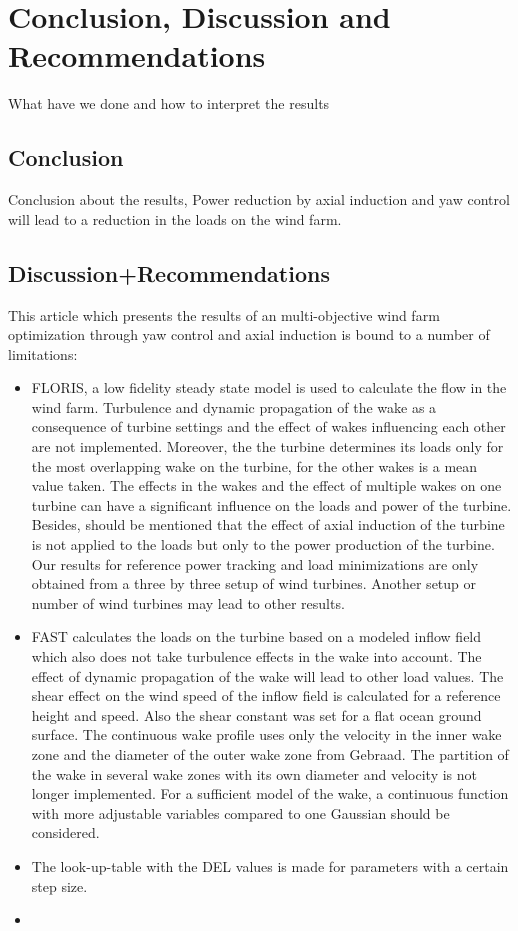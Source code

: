 \section{Conclusion, Discussion and Recommendations}
What have we done and how to interpret the results
\subsection{Conclusion}
Conclusion about the results, Power reduction by axial  induction and yaw control will lead to a reduction in the loads on the wind farm. 
 

\subsection{Discussion+Recommendations}
This article which presents the results of an multi-objective wind farm optimization through yaw control and axial induction is bound to a number of limitations:
\begin{itemize}
	\item FLORIS, a low fidelity steady state model is used to calculate the flow in the wind farm. Turbulence and dynamic propagation of the wake as a consequence of turbine settings and the effect of wakes influencing each other are not implemented. Moreover, the the turbine determines its loads only for the most overlapping wake on the turbine, for the other wakes is a mean value taken. The effects in the wakes and the effect of multiple wakes on one turbine can have a significant influence on the loads and power of the turbine. Besides, should be mentioned that the effect of axial induction of the turbine is not applied to the loads but only to the power production of the turbine. 
	Our results for reference power tracking and load minimizations are only obtained from a three by three setup of wind turbines. Another setup or number of wind turbines may lead to other results. 
	\item FAST calculates the loads on the turbine based on a modeled inflow field which also does not take turbulence effects in the wake into account. The effect of dynamic propagation of the wake will lead to other load values. The shear effect on the wind speed of the inflow field is calculated for a reference height and  speed. Also the shear constant was set for a flat ocean ground surface. 
	The continuous wake profile uses only the velocity in the inner wake zone and the diameter of the outer wake zone from Gebraad. \cite{Gebraad2016} The partition of the wake in several wake zones with its own diameter and velocity is not longer implemented. For a sufficient model of the wake, a continuous function with more adjustable variables compared to one Gaussian should be considered.  
	\item The look-up-table with the DEL values is made for parameters with a certain step size. 
	\item   
\end{itemize}   

